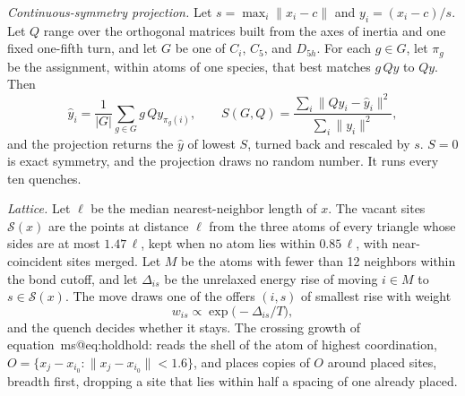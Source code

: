 \documentclass[journal=jctcce,manuscript=suppinfo]{achemso}
\makeatletter
\newcommand{\msref}[1]{\csname ms@#1\endcsname\mseqmark#1:\relax}
\def\mseqmark#1#2#3\relax{\ifx#1e\ifx#2q\ of the main text\fi\fi}
\makeatother
\begin{document}
\emph{Continuous-symmetry projection.}
Let \(s=\max_i\lVert x_i-c\rVert\) and \(y_i=(x_i-c)/s\).
Let \(Q\) range over the orthogonal matrices built from the axes of inertia
and one fixed one-fifth turn, and let \(G\) be one of \(C_i\), \(C_5\), and
\(D_{5h}\).
For each \(g\in G\), let \(\pi_g\) be the assignment, within atoms of one
species, that best matches \(g\,Qy\) to \(Qy\).
Then
\begin{equation}
\hat y_i = \frac1{|G|}\sum_{g\in G} g\,Qy_{\pi_g(i)},
\qquad
S(G,Q) = \frac{\sum_i\lVert Qy_i-\hat y_i\rVert^2}{\sum_i\lVert y_i\rVert^2},
\label{eq:csm}
\end{equation}
and the projection returns the \(\hat y\) of lowest \(S\), turned back and
rescaled by \(s\).
\(S=0\) is exact symmetry, and the projection draws no random number.
It runs every ten quenches.
\cite{oakley2013}

\emph{Lattice.}
Let \(\ell\) be the median nearest-neighbor length of \(x\).
The vacant sites \(\mathcal{S}(x)\) are the points at distance \(\ell\) from the
three atoms of every triangle whose sides are at most \(1.47\,\ell\), kept when
no atom lies within \(0.85\,\ell\), with near-coincident sites merged.
Let \(M\) be the atoms with fewer than 12 neighbors within the bond cutoff, and
let \(\Delta_{is}\) be the unrelaxed energy rise of moving \(i\in M\) to
\(s\in\mathcal{S}(x)\).
The move draws one of the offers \((i,s)\) of smallest rise with weight
\begin{equation}
w_{is} \propto \exp\!\bigl(-\Delta_{is}/T\bigr),
\label{eq:lattice-weight}
\end{equation}
and the quench decides whether it stays.
\cite{shaoChengCai2004}
The crossing growth of equation~\msref{eq:hold} reads the shell of the atom of
highest coordination, \(O=\{x_j-x_{i_0}: \lVert x_j-x_{i_0}\rVert<1.6\}\), and
places copies of \(O\) around placed sites, breadth first, dropping a site that
lies within half a spacing of one already placed.
\end{document}
